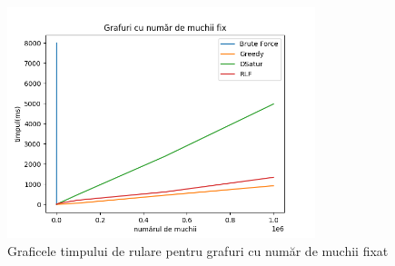 \documentclass[runningheads]{llncs}
\begin{document}
\begin{figure}[!]
\centering
\includegraphics[width=0.8\textwidth]{./graphics/fig6.png}
\caption{Graficele timpului de rulare pentru grafuri cu număr de muchii fixat}
\label{fig:fixed_edge_number_graphs}
\end{figure}
\end{document}
